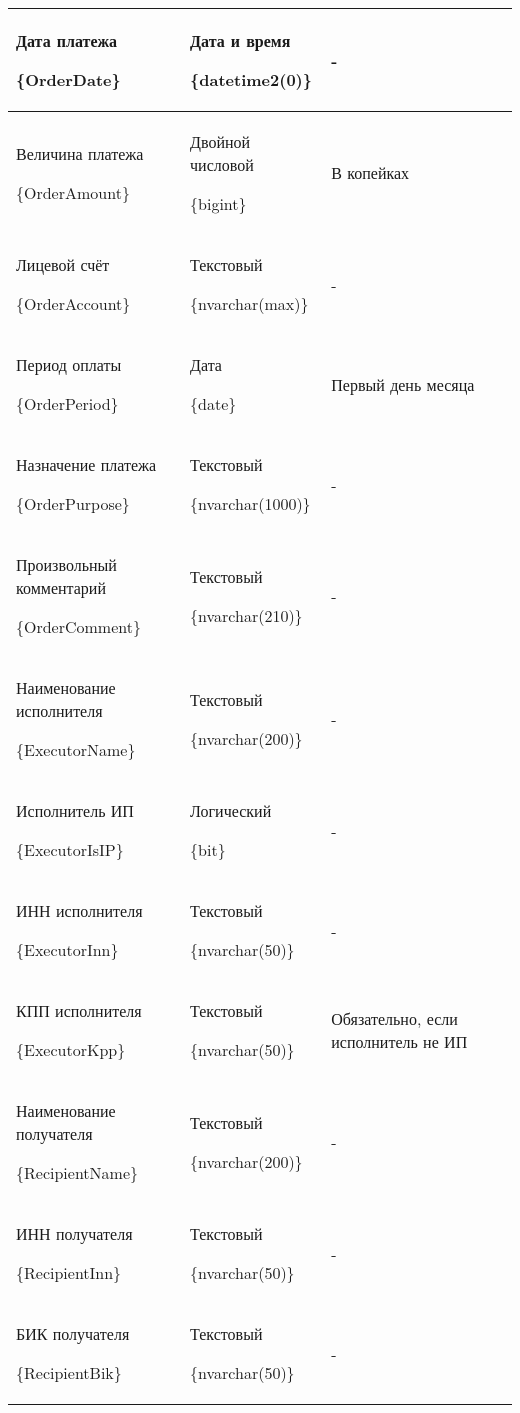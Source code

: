 \begin{myTable}
\begin{longtable}[h]{|p{}|p{}|p{}|}
	Дата платежа \par \{OrderDate\} & Дата и время \par \{datetime2(0)\} & - \\ \hline
	Величина платежа \par \{OrderAmount\} & Двойной числовой \par \{bigint\} & В копейках \\ \hline
	Лицевой счёт \par \{OrderAccount\} & Текстовый \par \{nvarchar(max)\} & - \\ \hline
	Период оплаты \par \{OrderPeriod\} & Дата \par \{date\} & Первый день месяца \\ \hline
	Назначение платежа \par \{OrderPurpose\} & Текстовый \par \{nvarchar(1000)\} & - \\ \hline
	Произвольный комментарий \par \{OrderComment\} & Текстовый \par \{nvarchar(210)\} & - \\ \hline
	Наименование исполнителя \par \{ExecutorName\} & Текстовый \par \{nvarchar(200)\} & - \\ \hline
	Исполнитель ИП \par \{ExecutorIsIP\} & Логический \par \{bit\} & - \\ \hline
	ИНН исполнителя \par \{ExecutorInn\} & Текстовый \par \{nvarchar(50)\} & - \\ \hline
	КПП исполнителя \par \{ExecutorKpp\} & Текстовый \par \{nvarchar(50)\} & Обязательно, если исполнитель не ИП \\ \hline
	Наименование получателя \par \{RecipientName\} & Текстовый \par \{nvarchar(200)\} & - \\ \hline
	ИНН получателя \par \{RecipientInn\} & Текстовый \par \{nvarchar(50)\} & - \\ \hline
	БИК получателя \par \{RecipientBik\} & Текстовый \par \{nvarchar(50)\} & - \\ \hline

\end{longtable}
\end{myTable}
